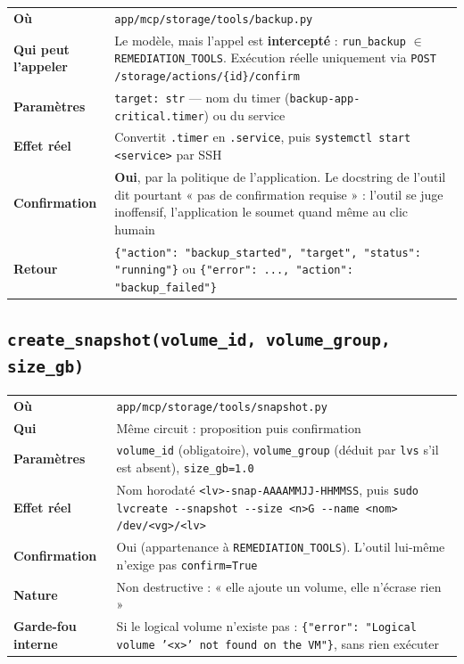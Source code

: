\documentclass[11pt,a4paper]{report}
\newcommand{\file}[1]{\texttt{\small #1}}
\newcommand{\fn}[1]{\texttt{\small\textcolor{oasisviolet}{#1}}}
\newcommand{\route}[1]{\texttt{\small\textcolor{oasisgreen}{#1}}}
\begin{document}
\begin{longtable}{@{}p{3.2cm}p{11.6cm}@{}}
\toprule
\endhead
\textbf{Où} & \file{app/mcp/storage/tools/backup.py}\\
\textbf{Qui peut l'appeler} & Le modèle, mais l'appel est \textbf{intercepté} : \texttt{run\_backup} $\in$ \texttt{REMEDIATION\_TOOLS}. Exécution réelle uniquement via \route{POST /storage/actions/\{id\}/confirm}\\
\textbf{Paramètres} & \texttt{target: str} --- nom du timer (\texttt{backup-app-critical.timer}) ou du service\\
\textbf{Effet réel} & Convertit \texttt{.timer} en \texttt{.service}, puis \texttt{systemctl start <service>} par SSH\\
\textbf{Confirmation} & \textbf{Oui}, par la politique de l'application. Le docstring de l'outil dit pourtant « pas de confirmation requise » : l'outil se juge inoffensif, l'application le soumet quand même au clic humain\\
\textbf{Retour} & \texttt{\{"action": "backup\_started", "target", "status": "running"\}} ou \texttt{\{"error": ..., "action": "backup\_failed"\}}\\
\bottomrule
\end{longtable}

\subsection{\fn{create\_snapshot(volume\_id, volume\_group, size\_gb)}}

\begin{longtable}{@{}p{3.2cm}p{11.6cm}@{}}
\toprule
\endhead
\textbf{Où} & \file{app/mcp/storage/tools/snapshot.py}\\
\textbf{Qui} & Même circuit : proposition puis confirmation\\
\textbf{Paramètres} & \texttt{volume\_id} (obligatoire), \texttt{volume\_group} (déduit par \texttt{lvs} s'il est absent), \texttt{size\_gb=1.0}\\
\textbf{Effet réel} & Nom horodaté \texttt{<lv>-snap-AAAAMMJJ-HHMMSS}, puis \texttt{sudo lvcreate -{}-snapshot -{}-size <n>G -{}-name <nom> /dev/<vg>/<lv>}\\
\textbf{Confirmation} & Oui (appartenance à \texttt{REMEDIATION\_TOOLS}). L'outil lui-même n'exige pas \texttt{confirm=True}\\
\textbf{Nature} & Non destructive : « elle ajoute un volume, elle n'écrase rien »\\
\textbf{Garde-fou interne} & Si le logical volume n'existe pas : \texttt{\{"error": "Logical volume '<x>' not found on the VM"\}}, sans rien exécuter\\
\bottomrule
\end{longtable}
\end{document}
